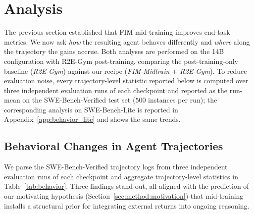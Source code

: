 
\section{Analysis}
\label{sec:analysis}

The previous section established that FIM mid-training improves end-task
metrics. We now ask \emph{how} the resulting agent behaves differently and
\emph{where} along the trajectory the gains accrue. Both analyses are
performed on the 14B configuration with R2E-Gym post-training, comparing the
post-training-only baseline (\emph{R2E-Gym}) against our recipe
(\emph{FIM-Midtrain $+$ R2E-Gym}). To reduce evaluation noise, every
trajectory-level statistic reported below is computed over three independent
evaluation runs of each checkpoint and reported as the run-mean on the
SWE-Bench-Verified test set ($500$ instances per run); the corresponding
analysis on SWE-Bench-Lite is reported in
Appendix~\ref{app:behavior_lite} and shows the same trends.

\subsection{Behavioral Changes in Agent Trajectories}
\label{sec:analysis:behavior}

We parse the SWE-Bench-Verified trajectory logs from three independent
evaluation runs of each checkpoint and aggregate trajectory-level statistics
in Table~\ref{tab:behavior}. Three findings stand out, all aligned with the
prediction of our motivating hypothesis (Section~\ref{sec:method:motivation})
that mid-training installs a structural prior for integrating external
returns into ongoing reasoning.

